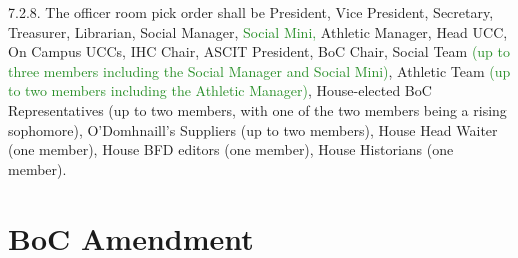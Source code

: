 \documentclass[10pt]{article} %
\begin{document}
\begin{itemize}
	7.2.8. The officer room pick order shall be President, Vice President, Secretary, Treasurer, Librarian, Social Manager, \textcolor{ForestGreen}{Social Mini,} Athletic Manager, Head UCC, On Campus UCCs, IHC Chair, ASCIT President, BoC Chair, Social Team \textcolor{ForestGreen}{(up to three members including the Social Manager and Social Mini)}, Athletic Team \textcolor{ForestGreen}{(up to two members including the Athletic Manager)}, House-elected BoC Representatives (up to two members, with one of the two members being a rising sophomore), O’Domhnaill’s Suppliers (up to two members), House Head Waiter (one member), House BFD editors (one member), House Historians (one member).
\end{itemize}

\section{BoC Amendment}
\end{document}
